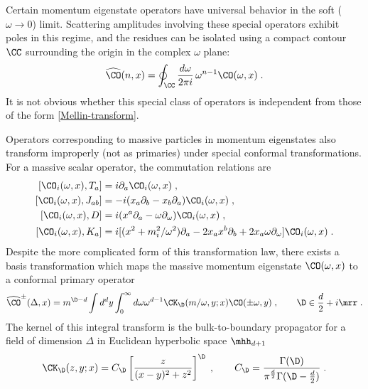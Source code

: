 \documentclass[11pt]{article}
\def\G{{\Gamma}}
\def\o{{\omega}}
\def\p{{\partial}}
\begin{document}
Certain momentum eigenstate operators have universal behavior in the soft ($\o \to 0$) limit. Scattering amplitudes involving these special operators exhibit poles in this regime, and the residues can be isolated using a compact contour $\CC$ surrounding the origin in the complex $\omega$ plane:
\begin{equation}\label{compactcontour}
\widehat{\CO}(n,x) =\oint_\CC \frac{d\o}{2\pi i }  \,\o^{n-1}\CO(\o,x) \; . 
\end{equation}
It is not obvious whether this special class of operators is independent from those of the form \eqref{Mellin-transform}.

Operators corresponding to massive particles in momentum eigenstates also transform improperly (not as primaries) under special conformal transformations. For a massive scalar operator, the commutation relations are
\begin{equation}
\begin{split}\label{LorentzTransform}
[ \CO_i(\o,x) , T_a ] &=  i \p_a \CO_i(\o,x) \; , \\
[ \CO_i(\o,x) , J_{ab} ] &=  - i ( x_a  \p_b - x_b \p_a ) \CO_i(\o,x) \;  , \\
[ \CO_i(\o,x) , D ] &= i ( x^a \p_a - \o \p_\o ) \CO_i(\o,x)   \;  , \\
[ \CO_i(\o,x) , K_a ] &= i  [ ( x^2 + m_i^2/\o^2 ) \p_a - 2 x_a x^b \p_b + 2 x_a \o \p_\o ] \CO_i(\o,x) \;  .  \\
\end{split}
\end{equation}
Despite the more complicated form of this transformation law, there exists a basis transformation which maps the massive momentum eigenstate $\CO(\o,x)$ to a conformal primary operator
\begin{equation}
\begin{split}\label{massive-basis-transform}
\widehat{\CO}^\pm(\Delta,x) = m^{\D-d} \int d^d y \int_0^\infty d\o \o^{d-1} \CK_\D (   m / \o , y  ; x  )  \CO ( \pm \o , y ) \;  , \qquad \D \in \frac{d}{2} + i \mrr \; . 
\end{split}
\end{equation}
The kernel of this integral transform is the bulk-to-boundary propagator for a field of dimension $\Delta$ in Euclidean hyperbolic space $\mhh_{d+1}$
\begin{equation}
\begin{split}\label{bulk-bdy-prop}
\CK_\D (z , y ; x  )  = C_\D \left[ \frac{ z  }{  ( x - y )^2 + z^2  }  \right]^\D \; , \qquad C_\D = \frac{\G(\D)}{\pi^{\frac{d}{2}} \G ( \D - \frac{d}{2} ) } \; . 
\end{split}
\end{equation}
\end{document}
